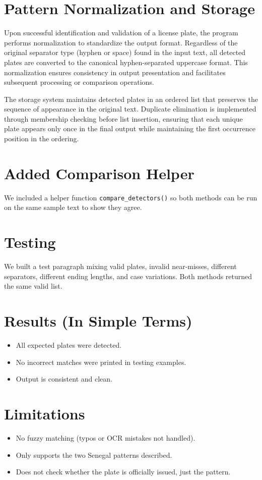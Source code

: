 \documentclass[12pt,a4paper]{article}
\begin{document}
\section{Pattern Normalization and Storage}

Upon successful identification and validation of a license plate, the program performs normalization to standardize the output format. Regardless of the original separator type (hyphen or space) found in the input text, all detected plates are converted to the canonical hyphen-separated uppercase format. This normalization ensures consistency in output presentation and facilitates subsequent processing or comparison operations.

The storage system maintains detected plates in an ordered list that preserves the sequence of appearance in the original text. Duplicate elimination is implemented through membership checking before list insertion, ensuring that each unique plate appears only once in the final output while maintaining the first occurrence position in the ordering.

\section{Added Comparison Helper}
We included a helper function \texttt{compare\_detectors()} so both methods can be run on the same sample text to show they agree.

\section{Testing}
We built a test paragraph mixing valid plates, invalid near-misses, different separators, different ending lengths, and case variations. Both methods returned the same valid list.

\section{Results (In Simple Terms)}
\begin{itemize}
    \item All expected plates were detected.
    \item No incorrect matches were printed in testing examples.
    \item Output is consistent and clean.
\end{itemize}

\section{Limitations}
\begin{itemize}
    \item No fuzzy matching (typos or OCR mistakes not handled).
    \item Only supports the two Senegal patterns described.
    \item Does not check whether the plate is officially issued, just the pattern.
\end{itemize}
\end{document}
